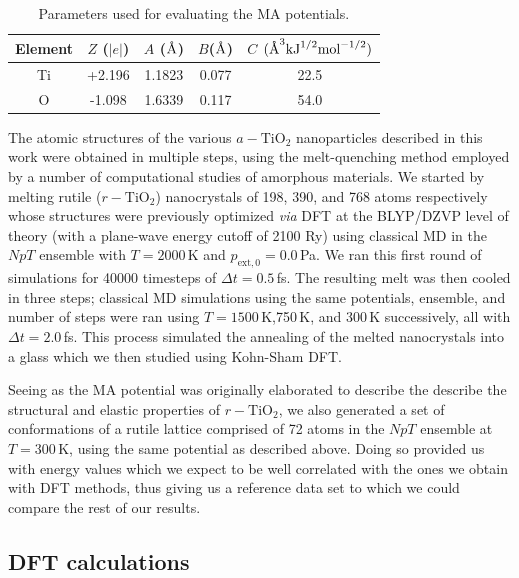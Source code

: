\documentclass[aps,prb,twocolumn,amsmath,amssymb,superscriptaddress,longbibliography]{revtex4-1}
\newcommand{\angstrom}{\text{\normalfont\AA}}
\newcommand\tab[1][1cm]{\hspace*{#1}} %
\begin{document}
\begin{table}[]
\centering
\caption{Parameters used for evaluating the MA potentials.}
\label{classpot}
\
\begin{tabular}{ccccc}
\hline
Element & $Z$ ($|e|$) & $A$ ($\angstrom$) & $B$($\angstrom$) & $C$ $(\angstrom^3\text{kJ}^{1/2}\text{mol}^{-1/2})$ \\ \hline
Ti      & +2.196      & 1.1823            & 0.077            & 22.5                                                \\
O       & -1.098      & 1.6339            & 0.117            & 54.0                                                \\ \hline
\end{tabular}
\end{table}

\tab The atomic structures of the various $a-\text{TiO}_2$ nanoparticles described in this work were obtained in multiple steps, using the melt-quenching method employed by a number of computational studies of amorphous materials\cite{ab_initio,melt_quenching}.
We started by melting rutile ($r-\text{TiO}_2$) nanocrystals of 198, 390, and 768 atoms respectively whose structures were previously optimized \textit{via} DFT at the BLYP/DZVP level of theory (with a plane-wave energy cutoff of 2100 Ry) using classical MD in the $NpT$ ensemble with $T = 2000\,$K and $p_{\text{ext},0} = 0.0\,$Pa. 
We ran this first round of simulations for 40000 timesteps of $\Delta t = 0.5\,$fs.
The resulting melt was then cooled in three steps; classical MD simulations using the same potentials, ensemble, and number of steps were ran using $T = 1500\,$K,750$\,$K, and 300$\,$K successively, all with $\Delta t = 2.0\,$fs.
This process simulated the annealing of the melted nanocrystals into a glass which we then studied using Kohn-Sham DFT.

\tab Seeing as the MA potential was originally elaborated to describe the describe the structural and elastic properties of $r-\text{TiO}_2$, we also generated a set of conformations of a rutile lattice comprised of 72 atoms in the $NpT$ ensemble at $T = 300\,\text{K}$, using the same potential as described above.
Doing so provided us with energy values which we expect to be well correlated with the ones we obtain with DFT methods, thus giving us a reference data set to which we could compare the rest of our results.

\subsection{DFT calculations}
\end{document}
